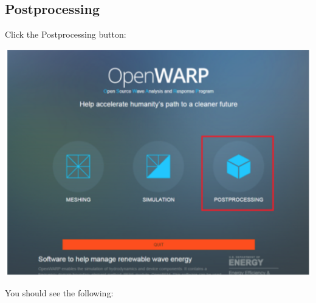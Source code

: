 \documentclass[12pt]{article}
\begin{document}
\subsection{Postprocessing}
Click the Postprocessing button:

\vspace{\abovedisplayskip}
\begin{minipage}{\linewidth}
	\centering
	\includegraphics[scale=0.4]{img/33}
\end{minipage}
\vspace{\belowdisplayskip}

You should see the following:
\end{document}
